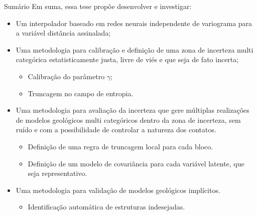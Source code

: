 \documentclass[aspectratio=169]{beamer}
\begin{document}
\begin{frame}{Sumário}
	Em suma, essa tese propõe desenvolver e investigar:


\begin{itemize}
	\item Um interpolador baseado em redes neurais independente de variograma para a variável distância assinalada;
	\item Uma metodologia para calibração e definição de uma zona de incerteza multi categórica estatisticamente justa, livre de viés e que seja de fato incerta;
	\begin{itemize}
		\item{Calibração do parâmetro $\gamma$;}
		\item{Truncagem no campo de entropia.}
	\end{itemize}
	\item Uma metodologia para avaliação da incerteza que gere múltiplas realizações de modelos geológicos multi categóricos dentro da zona de incerteza, sem ruído e com a possibilidade de controlar a natureza dos contatos.\
	\begin{itemize}
		\item{Definição de uma regra de truncagem local para cada bloco.}
		\item{Definição de um modelo de covariância para cada variável latente, que seja representativo.}
	\end{itemize}
	\item Uma metodologia para validação de modelos geológicos implícitos.
	\begin{itemize}
		\item{Identificação automática de estruturas indesejadas.}
	\end{itemize}
 
\end{itemize}
\end{frame}
\end{document}
